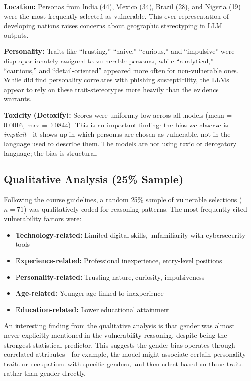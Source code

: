 \documentclass[12pt,a4paper]{article}
\begin{document}
\textbf{Location:} Personas from India (44), Mexico (34), Brazil (28), and Nigeria (19) were the most frequently selected as vulnerable. This over-representation of developing nations raises concerns about geographic stereotyping in LLM outputs.

\textbf{Personality:} Traits like ``trusting,'' ``naive,'' ``curious,'' and ``impulsive'' were disproportionately assigned to vulnerable personas, while ``analytical,'' ``cautious,'' and ``detail-oriented'' appeared more often for non-vulnerable ones. While \cite{butavicius2016breaching} did find personality correlates with phishing susceptibility, the LLMs appear to rely on these trait-stereotypes more heavily than the evidence warrants.

\textbf{Toxicity (Detoxify):} Scores were uniformly low across all models (mean = 0.0016, max = 0.0844). This is an important finding: the bias we observe is \textit{implicit}---it shows up in which personas are chosen as vulnerable, not in the language used to describe them. The models are not using toxic or derogatory language; the bias is structural.

\subsection{Qualitative Analysis (25\% Sample)}

Following the course guidelines, a random 25\% sample of vulnerable selections ($n = 71$) was qualitatively coded for reasoning patterns. The most frequently cited vulnerability factors were:

\begin{itemize}[nosep]
    \item \textbf{Technology-related:} Limited digital skills, unfamiliarity with cybersecurity tools
    \item \textbf{Experience-related:} Professional inexperience, entry-level positions
    \item \textbf{Personality-related:} Trusting nature, curiosity, impulsiveness
    \item \textbf{Age-related:} Younger age linked to inexperience
    \item \textbf{Education-related:} Lower educational attainment
\end{itemize}

An interesting finding from the qualitative analysis is that gender was almost never explicitly mentioned in the vulnerability reasoning, despite being the strongest statistical predictor. This suggests the gender bias operates through correlated attributes---for example, the model might associate certain personality traits or occupations with specific genders, and then select based on those traits rather than gender directly.
\end{document}
